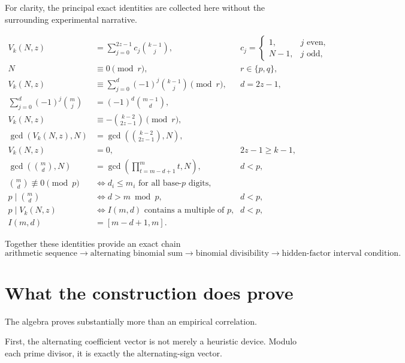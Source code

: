 \documentclass[11pt,a4paper]{article}
\newcommand{\N}{N}
\begin{document}
For clarity, the principal exact identities are collected here without the surrounding experimental narrative.

\begin{align}
V_k(N,z)
&=\sum_{j=0}^{2z-1}c_j\binom{k-1}{j},
&&c_j=\begin{cases}1,&j\text{ even},\\N-1,&j\text{ odd},\end{cases}
\label{eq:id1}\\[4pt]
N&\equiv0\pmod r,
&&r\in\{p,q\},
\label{eq:id2}\\[4pt]
V_k(N,z)
&\equiv\sum_{j=0}^{d}(-1)^j\binom{k-1}{j}\pmod r,
&&d=2z-1,
\label{eq:id3}\\[4pt]
\sum_{j=0}^{d}(-1)^j\binom{m}{j}
&=(-1)^d\binom{m-1}{d},
\label{eq:id4}\\[4pt]
V_k(N,z)
&\equiv-\binom{k-2}{2z-1}\pmod r,
\label{eq:id5}\\[4pt]
\gcd(V_k(N,z),N)
&=\gcd\!\left(\binom{k-2}{2z-1},N\right),
\label{eq:id6}\\[4pt]
V_k(N,z)&=0,
&&2z-1\ge k-1,
\label{eq:id7}\\[4pt]
\gcd\!\left(\binom{m}{d},N\right)
&=\gcd\!\left(\prod_{t=m-d+1}^{m}t,N\right),
&&d<p,
\label{eq:id8}\\[4pt]
\binom{m}{d}\not\equiv0\pmod p
&\iff d_i\le m_i\text{ for all base-}p\text{ digits},
\label{eq:id9}\\[4pt]
 p\mid\binom{m}{d}
&\iff d>m\bmod p,
&&d<p,
\label{eq:id10}\\[4pt]
p\mid V_k(N,z)
&\iff I(m,d)\text{ contains a multiple of }p,
&&d<p,
\label{eq:id11}\\[4pt]
I(m,d)&=[m-d+1,m].
\label{eq:id12}
\end{align}

Together these identities provide an exact chain
\[
\boxed{
\text{arithmetic sequence}
\longrightarrow
\text{alternating binomial sum}
\longrightarrow
\text{binomial divisibility}
\longrightarrow
\text{hidden-factor interval condition}.
}
\]

\section{What the construction does prove}
\label{sec:proves}

The algebra proves substantially more than an empirical correlation.

First, the alternating coefficient vector is not merely a heuristic device. Modulo each prime divisor, it is exactly the alternating-sign vector.
\end{document}
